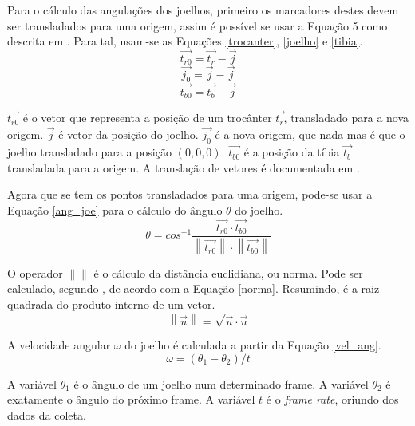 Para o cálculo das angulações dos joelhos, primeiro os marcadores destes devem ser transladados para uma origem, assim é possível se usar a Equação 5 como descrita em \cite{Edwards2006}. 
Para tal, usam-se as Equações \ref{trocanter}, \ref{joelho} e \ref{tibia}.
\begin{equation}
	\label{trocanter}
	\vec{t_{r0}} = \vec{t_r} - \vec{j}
\end{equation}
\begin{equation}
	\label{joelho}
	\vec{j_0} = \vec{j} - \vec{j}
\end{equation}
\begin{equation}
	\label{tibia}
	\vec{t_{b0}} = \vec{t_b} - \vec{j}
\end{equation}

$\vec{t_{r0}}$ é o vetor que representa a posição de um trocânter $\vec{t_r}$, transladado para a nova origem.
$\vec{j}$ é vetor da posição do joelho.
$\vec{j_0}$ é a nova origem, que nada mas é que o joelho transladado para a posição $(0,0,0)$. 
$\vec{t_{b0}}$ é a posição da tíbia $\vec{t_b}$ transladada para a origem.
A translação de vetores é documentada em \cite{Poole2011}.

Agora que se tem os pontos transladados para uma origem, pode-se usar a Equação \ref{ang_joe} para o cálculo do ângulo $\theta$ do joelho.
\begin{equation}
	\label{ang_joe}
	\theta =
		cos^{-1} 
		\frac
		{
			\vec{t_{r0}} \cdot \vec{t_{b0}}
		}
		{
			\left \| \vec{t_{r0}} \right \|
			\cdot
			\left \| \vec{t_{b0}} \right \|
		}
\end{equation}

O operador $\left \| \right \|$ é o cálculo da distância euclidiana, ou norma. Pode ser calculado, segundo \cite{Poole2011}, de acordo com a Equação \ref{norma}. Resumindo, é a raiz quadrada do produto interno de um vetor.
\begin{equation}
	\label{norma}
	\left \| \vec{u} \right \| = \sqrt{\vec{u}\cdot\vec{u}}
\end{equation}

A velocidade angular $\omega$ do joelho é calculada a partir da Equação \ref{vel_ang}.
\begin{equation}
	\label{vel_ang}
	\omega = (\theta_1 - \theta_2) / t
\end{equation}

A variável $\theta_1$ é o ângulo de um joelho num determinado frame. A variável $\theta_2$ é exatamente o ângulo do próximo frame. A variável $t$ é o \emph{frame rate}, oriundo dos dados da coleta.


